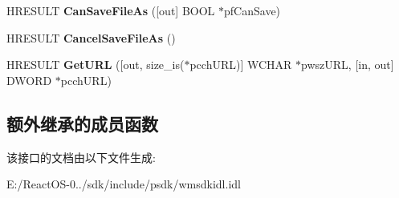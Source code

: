 \begin{DoxyCompactItemize}
H\+R\+E\+S\+U\+LT {\bfseries Can\+Save\+File\+As} (\mbox{[}out\mbox{]} B\+O\+OL $\ast$pf\+Can\+Save)
\item 
\mbox{\label{interface_i_w_m_reader_advanced4_a26bfe4d79f340cecc985993591370b71}} 
H\+R\+E\+S\+U\+LT {\bfseries Cancel\+Save\+File\+As} ()
\item 
\mbox{\label{interface_i_w_m_reader_advanced4_a815125a0d8c8fe2e78c8de599236fab8}} 
H\+R\+E\+S\+U\+LT {\bfseries Get\+U\+RL} (\mbox{[}out, size\+\_\+is($\ast$pcch\+U\+RL)\mbox{]} W\+C\+H\+AR $\ast$pwsz\+U\+RL, \mbox{[}in, out\mbox{]} D\+W\+O\+RD $\ast$pcch\+U\+RL)
\end{DoxyCompactItemize}
\subsection*{额外继承的成员函数}


该接口的文档由以下文件生成\+:\begin{DoxyCompactItemize}
\item 
E\+:/\+React\+O\+S-\/0../sdk/include/psdk/wmsdkidl.\+idl\end{DoxyCompactItemize}
